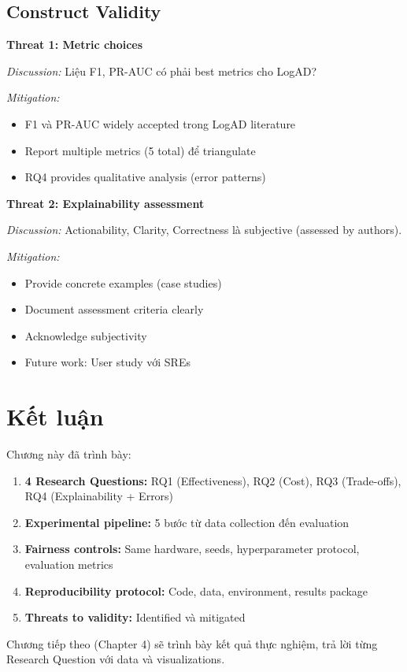 \subsection{Construct Validity}

\textbf{Threat 1: Metric choices}

\textit{Discussion:} Liệu F1, PR-AUC có phải best metrics cho LogAD?

\textit{Mitigation:}
\begin{itemize}
    \item F1 và PR-AUC widely accepted trong LogAD literature
    \item Report multiple metrics (5 total) để triangulate
    \item RQ4 provides qualitative analysis (error patterns)
\end{itemize}

\textbf{Threat 2: Explainability assessment}

\textit{Discussion:} Actionability, Clarity, Correctness là subjective (assessed by authors).

\textit{Mitigation:}
\begin{itemize}
    \item Provide concrete examples (case studies)
    \item Document assessment criteria clearly
    \item Acknowledge subjectivity
    \item Future work: User study với SREs
\end{itemize}

\section{Kết luận}
\label{sec:methodology-conclusion}

Chương này đã trình bày:
\begin{enumerate}
    \item \textbf{4 Research Questions:} RQ1 (Effectiveness), RQ2 (Cost), RQ3 (Trade-offs), RQ4 (Explainability + Errors)
    \item \textbf{Experimental pipeline:} 5 bước từ data collection đến evaluation
    \item \textbf{Fairness controls:} Same hardware, seeds, hyperparameter protocol, evaluation metrics
    \item \textbf{Reproducibility protocol:} Code, data, environment, results package
    \item \textbf{Threats to validity:} Identified và mitigated
\end{enumerate}

Chương tiếp theo (Chapter 4) sẽ trình bày kết quả thực nghiệm, trả lời từng Research Question với data và visualizations.
